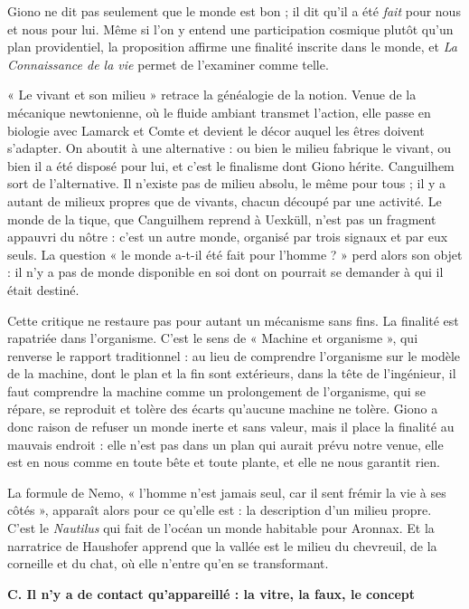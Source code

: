 \documentclass[11pt,a4paper]{article}
\begin{document}
Giono ne dit pas seulement que le monde est bon ; il dit qu'il a été \emph{fait} pour nous et nous pour lui. Même si l'on y entend une participation cosmique plutôt qu'un plan providentiel, la proposition affirme une finalité inscrite dans le monde, et \emph{La Connaissance de la vie} permet de l'examiner comme telle.

« Le vivant et son milieu » retrace la généalogie de la notion. Venue de la mécanique newtonienne, où le fluide ambiant transmet l'action, elle passe en biologie avec Lamarck et Comte et devient le décor auquel les êtres doivent s'adapter. On aboutit à une alternative : ou bien le milieu fabrique le vivant, ou bien il a été disposé pour lui, et c'est le finalisme dont Giono hérite. Canguilhem sort de l'alternative. Il n'existe pas de milieu absolu, le même pour tous ; il y a autant de milieux propres que de vivants, chacun découpé par une activité. Le monde de la tique, que Canguilhem reprend à Uexküll, n'est pas un fragment appauvri du nôtre : c'est un autre monde, organisé par trois signaux et par eux seuls. La question « le monde a-t-il été fait pour l'homme ? » perd alors son objet : il n'y a pas de monde disponible en soi dont on pourrait se demander à qui il était destiné.

Cette critique ne restaure pas pour autant un mécanisme sans fins. La finalité est rapatriée dans l'organisme. C'est le sens de « Machine et organisme », qui renverse le rapport traditionnel : au lieu de comprendre l'organisme sur le modèle de la machine, dont le plan et la fin sont extérieurs, dans la tête de l'ingénieur, il faut comprendre la machine comme un prolongement de l'organisme, qui se répare, se reproduit et tolère des écarts qu'aucune machine ne tolère. Giono a donc raison de refuser un monde inerte et sans valeur, mais il place la finalité au mauvais endroit : elle n'est pas dans un plan qui aurait prévu notre venue, elle est en nous comme en toute bête et toute plante, et elle ne nous garantit rien.

La formule de Nemo, « l'homme n'est jamais seul, car il sent frémir la vie à ses côtés », apparaît alors pour ce qu'elle est : la description d'un milieu propre. C'est le \emph{Nautilus} qui fait de l'océan un monde habitable pour Aronnax. Et la narratrice de Haushofer apprend que la vallée est le milieu du chevreuil, de la corneille et du chat, où elle n'entre qu'en se transformant.

\textbf{C. Il n'y a de contact qu'appareillé : la vitre, la faux, le concept}
\end{document}
